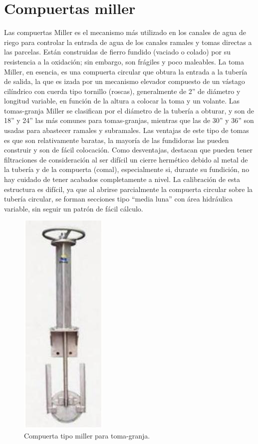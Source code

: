 \section{Compuertas miller}
\label{sec:ejemplo}
Las compuertas Miller es el mecanismo más utilizado en los canales de agua de riego para controlar la entrada de agua de los canales ramales y tomas directas a las parcelas. Están construidas de fierro fundido (vaciado o colado) por su resistencia a la oxidación; sin embargo, son frágiles y poco maleables. La toma Miller, en esencia, es una compuerta circular que obtura la entrada a la tubería de salida, la que es izada por un mecanismo elevador compuesto de un vástago cilíndrico con cuerda tipo tornillo (roscas), generalmente de 2” de diámetro y longitud variable, en función de la altura a colocar la toma y un volante. Las tomas-granja Miller se clasifican por el diámetro de la tubería a obturar, y son de 18” y 24” las más comunes para tomas-granjas, mientras que las de 30” y 36” son usadas para abastecer ramales y subramales.
Las ventajas de este tipo de tomas es que son relativamente baratas, la mayoría de las fundidoras las pueden construir y son de fácil colocación. Como desventajas, destacan que pueden tener filtraciones de consideración al ser difícil un cierre hermético debido al metal de la tubería y de la compuerta (comal), especialmente si, durante su fundición, no hay cuidado de tener acabados completamente a nivel. La calibración de esta estructura es difícil, ya que al abrirse parcialmente la compuerta circular sobre la tubería circular, se forman secciones tipo “media luna” con área hidráulica variable, sin seguir un patrón de fácil cálculo.

\begin{figure}[h]
\centering
\includegraphics[scale=.55]{./Figures/CompuertaMiller.jpeg}
\caption{Compuerta tipo miller para toma-granja.}
\label{fig:CeldaPrimaria}
\end{figure}

